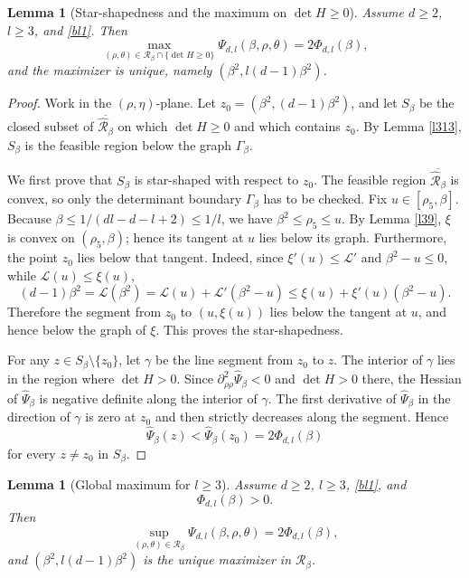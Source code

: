 \documentclass[11pt]{amsart}
\theoremstyle{plain}
\newtheorem{lemma}[theorem]{Lemma}
\numberwithin{equation}{section}
\numberwithin{theorem}{section}
\numberwithin{figure}{section}
\begin{document}
\begin{lemma}[Star-shapedness and the maximum on $\det H\geq0$]\label{lm39}
Assume $d\geq2$, $l\geq3$, and \eqref{bl1}.  Then
\begin{equation*}
\max_{(\rho,\theta)\in\mathcal R_\beta\cap\{\det H\geq0\}}
\Psi_{d,l}(\beta,\rho,\theta)=2\Phi_{d,l}(\beta),
\end{equation*}
and the maximizer is unique, namely $(\beta^2,l(d-1)\beta^2)$.
\end{lemma}

\begin{proof}
Work in the $(\rho,\eta)$-plane.  Let
$z_0=(\beta^2,(d-1)\beta^2)$, and let $S_\beta$ be the closed subset of
$\overline{\widehat{\mathcal R}_\beta}$ on which $\det H\geq0$ and which contains
$z_0$.  By Lemma \ref{l313}, $S_\beta$ is the feasible region below the graph
$\Gamma_\beta$.

We first prove that $S_\beta$ is star-shaped with respect to $z_0$.  The feasible region
$\overline{\widehat{\mathcal R}_\beta}$ is convex, so only the determinant boundary
$\Gamma_\beta$ has to be checked.  Fix $u\in[\rho_5,\beta]$.  Because
$\beta\leq1/(dl-d-l+2)\leq1/l$, we have $\beta^2\leq\rho_5\leq u$.  By Lemma \ref{l39},
$\xi$ is convex on $(\rho_5,\beta)$; hence its tangent at $u$ lies below its graph.
Furthermore, the point $z_0$ lies below that tangent.  Indeed, since
$\xi'(u)\leq\mathcal L'$ and $\beta^2-u\leq0$, while
$\mathcal L(u)\leq\xi(u)$,
\[
(d-1)\beta^2=\mathcal L(\beta^2)
=\mathcal L(u)+\mathcal L'(\beta^2-u)
\leq \xi(u)+\xi'(u)(\beta^2-u).
\]
Therefore the segment from $z_0$ to $(u,\xi(u))$ lies below the tangent at $u$, and hence
below the graph of $\xi$.  This proves the star-shapedness.

For any $z\in S_\beta\setminus\{z_0\}$, let $\gamma$ be the line segment from $z_0$ to
$z$.  The interior of $\gamma$ lies in the region where $\det H>0$.  Since
$\partial_{\rho\rho}^2\widehat\Psi_\beta<0$ and $\det H>0$ there, the Hessian of
$\widehat\Psi_\beta$ is negative definite along the interior of $\gamma$.  The first
derivative of $\widehat\Psi_\beta$ in the direction of $\gamma$ is zero at $z_0$ and then
strictly decreases along the segment.  Hence
\[
\widehat\Psi_\beta(z)<\widehat\Psi_\beta(z_0)=2\Phi_{d,l}(\beta)
\]
for every $z\ne z_0$ in $S_\beta$.
\end{proof}

\begin{lemma}[Global maximum for $l\geq3$]\label{lm313}
Assume $d\geq2$, $l\geq3$, \eqref{bl1}, and
\begin{equation}
\Phi_{d,l}(\beta)>0.
\label{eq:Phi-positive}
\end{equation}
Then
\begin{equation*}
\sup_{(\rho,\theta)\in\mathcal R_\beta}
\Psi_{d,l}(\beta,\rho,\theta)=2\Phi_{d,l}(\beta),
\end{equation*}
and $(\beta^2,l(d-1)\beta^2)$ is the unique maximizer in $\mathcal R_\beta$.
\end{lemma}
\end{document}
